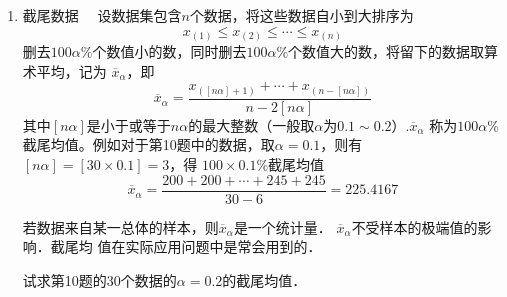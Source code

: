 \begin{enumerate}
    \item {\heiti 截尾数据}$\quad$ 设数据集包含$n$个数据，将这些数据自小到大排序为
    $$x_{(1)}\leq x_{(2)} \leq \cdots \leq x_{(n)}$$
    删去$100\alpha \%$个数值小的数，同时删去$100\alpha \%$个数值大的数，将留下的数据取算术平均，记为
    $\overline{x}_\alpha$，即
    $$\overline{x}_\alpha=\frac{x_{([n\alpha]+1)}+\cdots+x_{(n-[n\alpha])}}{n-2[n\alpha]}$$
    其中$[n\alpha]$是小于或等于$n\alpha$的最大整数（一般取$\alpha$为$0.1\sim 0.2$）.$\overline{x}_\alpha$
    称为$100\alpha\%$截尾均值。例如对于第10题中的数据，取$\alpha=0.1$，则有$[n\alpha]=[30\times 0.1]=3$，得
    $100\times 0.1\%$截尾均值
    $$\overline{x}_\alpha=\frac{200+200+\cdots+245+245}{30-6}=225.4167$$
    \par 若数据来自某一总体的样本，则$\overline{x}_\alpha$是一个统计量． $\overline{x}_\alpha$不受样本的极端值的影响．截尾均
    值在实际应用问题中是常会用到的．
    \par 试求第10题的30个数据的$\alpha=0.2$的截尾均值．
    

    


  

\end{enumerate}
